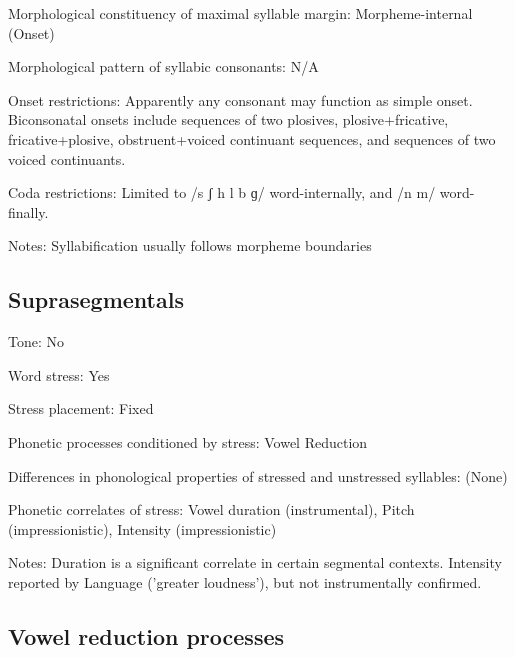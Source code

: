 {\begin{appendixdesc}
\item[Morphological constituency of maximal syllable margin:] Morpheme-internal (Onset)

\item[Morphological pattern of syllabic consonants:] N/A

\item[Onset restrictions:] Apparently any consonant may function as simple onset. Biconsonatal onsets include sequences of two plosives, plosive+fricative, fricative+plosive, obstruent+voiced continuant sequences, and sequences of two voiced continuants.

\item[Coda restrictions:] Limited to /s ʃ h l b ɡ/ word-internally, and /n m/ word-finally.

\item[Notes:] Syllabification usually follows morpheme boundaries
\end{appendixdesc}
\subsection*{Suprasegmentals}
\begin{appendixdesc}
\item[Tone:] No

\item[Word stress:] Yes

\item[Stress placement:] Fixed

\item[Phonetic processes conditioned by stress:] Vowel Reduction

\item[Differences in phonological properties of stressed and unstressed syllables:] (None)

\item[Phonetic correlates of stress:] Vowel duration (instrumental), Pitch (impressionistic), Intensity (impressionistic)

\item[Notes:] Duration is a significant correlate in certain segmental contexts. Intensity reported by  Language \citet{Consortium2008} (’greater loudness’), but not instrumentally confirmed.
\end{appendixdesc}
\subsection*{Vowel reduction processes}
\begin{appendixdesc}


\end{appendixdesc}}
